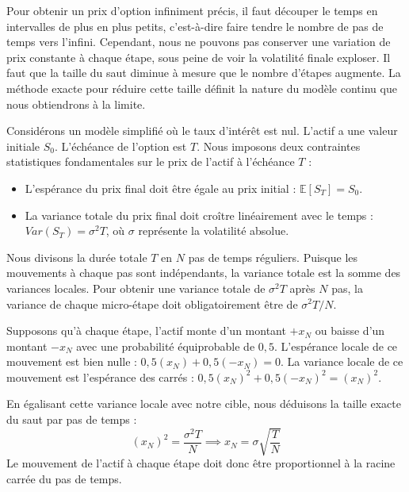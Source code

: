 Pour obtenir un prix d'option infiniment précis, il faut découper le temps en intervalles de plus en plus petits, c'est-à-dire faire tendre le nombre de pas de temps vers l'infini. Cependant, nous ne pouvons pas conserver une variation de prix constante à chaque étape, sous peine de voir la volatilité finale exploser. Il faut que la taille du saut diminue à mesure que le nombre d'étapes augmente. La méthode exacte pour réduire cette taille définit la nature du modèle continu que nous obtiendrons à la limite.

Considérons un modèle simplifié où le taux d'intérêt est nul. L'actif a une valeur initiale $S_0$. L'échéance de l'option est $T$.
Nous imposons deux contraintes statistiques fondamentales sur le prix de l'actif à l'échéance $T$ :
\begin{itemize}[label=$\rightarrow$]
    \item L'espérance du prix final doit être égale au prix initial : $\mathbb{E}[S_T] = S_0$.
    \item La variance totale du prix final doit croître linéairement avec le temps : $Var(S_T) = \sigma^2 T$, où $\sigma$ représente la volatilité absolue.
\end{itemize}

Nous divisons la durée totale $T$ en $N$ pas de temps réguliers. Puisque les mouvements à chaque pas sont indépendants, la variance totale est la somme des variances locales. Pour obtenir une variance totale de $\sigma^2 T$ après $N$ pas, la variance de chaque micro-étape doit obligatoirement être de $\sigma^2 T / N$.

Supposons qu'à chaque étape, l'actif monte d'un montant $+x_N$ ou baisse d'un montant $-x_N$ avec une probabilité équiprobable de $0,5$.
L'espérance locale de ce mouvement est bien nulle : $0,5(x_N) + 0,5(-x_N) = 0$.
La variance locale de ce mouvement est l'espérance des carrés : $0,5(x_N)^2 + 0,5(-x_N)^2 = (x_N)^2$.

En égalisant cette variance locale avec notre cible, nous déduisons la taille exacte du saut par pas de temps :
\begin{equation}
    \label{eq:fsec3-taille_saut}
    (x_N)^2 = \frac{\sigma^2 T}{N} \implies x_N = \sigma \sqrt{\frac{T}{N}}
\end{equation}
Le mouvement de l'actif à chaque étape doit donc être proportionnel à la racine carrée du pas de temps.

